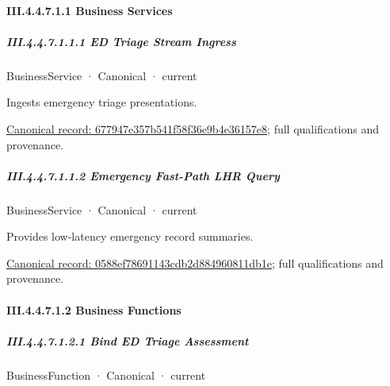 \paragraph*{III.4.4.7.1.1 Business Services}
\label{navigation:III.4.4.7.1.1}

\subparagraph*{III.4.4.7.1.1.1 ED Triage Stream Ingress}
\label{navigation:III.4.4.7.1.1.1}

\label{element:677947e357b541f58f36e9b4e36157e8}
{\small BusinessService · Canonical · current}\par

Ingests emergency triage presentations.


{\footnotesize \href{../../../../continuum/business/business-service/677947e357b541f58f36e9b4e36157e8.md}{Canonical record: 677947e357b541f58f36e9b4e36157e8}; full qualifications and provenance.}\par
\subparagraph*{III.4.4.7.1.1.2 Emergency Fast-Path LHR Query}
\label{navigation:III.4.4.7.1.1.2}

\label{element:0588ef78691143cdb2d884960811db1e}
{\small BusinessService · Canonical · current}\par

Provides low-latency emergency record summaries.


{\footnotesize \href{../../../../continuum/business/business-service/0588ef78691143cdb2d884960811db1e.md}{Canonical record: 0588ef78691143cdb2d884960811db1e}; full qualifications and provenance.}\par
\paragraph*{III.4.4.7.1.2 Business Functions}
\label{navigation:III.4.4.7.1.2}

\subparagraph*{III.4.4.7.1.2.1 Bind ED Triage Assessment}
\label{navigation:III.4.4.7.1.2.1}

\label{element:fa51fad9b9344546953ff8ec5b5f39ca}
{\small BusinessFunction · Canonical · current}\par

